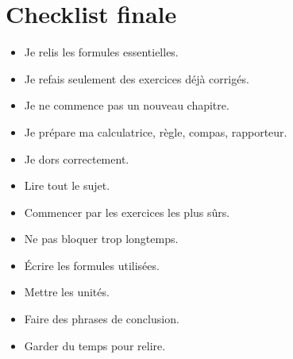 \documentclass[11pt,a4paper]{article}
\newcounter{exercice}
\begin{document}
\section{Checklist finale}

\begin{tcolorbox}[colframe=bleu,colback=blue!3!white,title=La veille de l'épreuve de mathématiques]
\begin{itemize}
  \item Je relis les formules essentielles.
  \item Je refais seulement des exercices déjà corrigés.
  \item Je ne commence pas un nouveau chapitre.
  \item Je prépare ma calculatrice, règle, compas, rapporteur.
  \item Je dors correctement.
\end{itemize}
\end{tcolorbox}

\begin{tcolorbox}[colframe=rouge,colback=red!3!white,title=Pendant l'épreuve]
\begin{itemize}
  \item Lire tout le sujet.
  \item Commencer par les exercices les plus sûrs.
  \item Ne pas bloquer trop longtemps.
  \item Écrire les formules utilisées.
  \item Mettre les unités.
  \item Faire des phrases de conclusion.
  \item Garder du temps pour relire.
\end{itemize}
\end{tcolorbox}

\newpage
\end{document}
